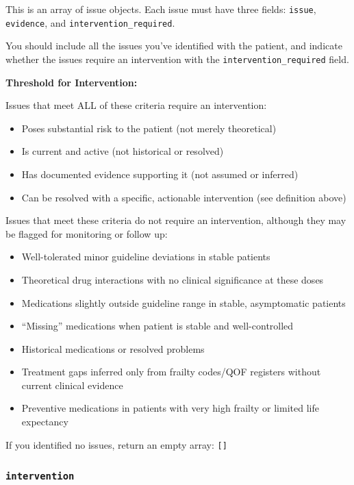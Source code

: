 \begin{systemprompt}
    This is an array of issue objects. Each issue must have three fields: \texttt{issue}, \texttt{evidence}, and \texttt{intervention\_required}.
    
    You should include all the issues you've identified with the patient, and indicate whether the issues require an intervention with the \texttt{intervention\_required} field.
    
    \textbf{Threshold for Intervention:}
    
    Issues that meet ALL of these criteria require an intervention:
    \begin{itemize}[leftmargin=*]
        \item Poses substantial risk to the patient (not merely theoretical)
        \item Is current and active (not historical or resolved)
        \item Has documented evidence supporting it (not assumed or inferred)
        \item Can be resolved with a specific, actionable intervention (see definition above)
    \end{itemize}
    
    Issues that meet these criteria do not require an intervention, although they may be flagged for monitoring or follow up:
    \begin{itemize}[leftmargin=*]
        \item Well-tolerated minor guideline deviations in stable patients
        \item Theoretical drug interactions with no clinical significance at these doses
        \item Medications slightly outside guideline range in stable, asymptomatic patients
        \item ``Missing'' medications when patient is stable and well-controlled
        \item Historical medications or resolved problems
        \item Treatment gaps inferred only from frailty codes/QOF registers without current clinical evidence
        \item Preventive medications in patients with very high frailty or limited life expectancy
    \end{itemize}
    
    If you identified no issues, return an empty array: \texttt{[]}
    
    \subsubsection*{\texttt{intervention}}
    

\end{systemprompt}
